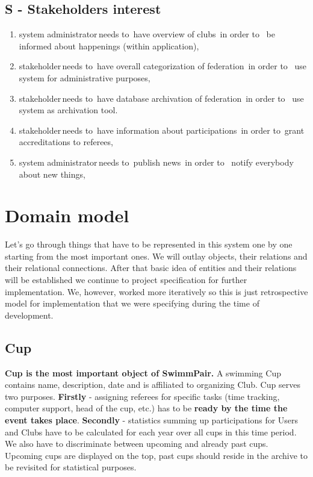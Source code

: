 \subsection*{S - Stakeholders interest}
\begin{enumerate}
  \item \lbrack system administrator\rbrack \,needs to\, \lbrack have overview of clubs\rbrack \, in order to \, \lbrack be informed about happenings (within application)\rbrack,
  \item \lbrack stakeholder\rbrack \,needs to\, \lbrack have overall categorization of federation\rbrack \, in order to \, \lbrack use system for administrative purposes\rbrack,
  \item \lbrack stakeholder\rbrack \,needs to\, \lbrack have database archivation of federation\rbrack \, in order to \, \lbrack use system as archivation tool\rbrack.
  \item \lbrack stakeholder\rbrack \,needs to\, \lbrack have information about participations\rbrack \, in order to\, \lbrack grant accreditations to referees\rbrack,
  \item \lbrack system administrator\rbrack \,needs to\, \lbrack publish news\rbrack \, in order to \, \lbrack notify everybody about new things\rbrack,
\end{enumerate}
\section{Domain model}
Let's go through things that have to be represented in this system one by one starting from the most important ones. We will outlay  objects, their relations and their relational connections. After that basic idea of entities and their relations will be established we continue to project specification for further implementation. We, however, worked more iteratively so this is just retrospective model for implementation that we were specifying during the time of development. 
\par
\subsection*{Cup}
\textbf{Cup is the most important object of SwimmPair.} A swimming Cup contains name, description, date and is affiliated to organizing Club. Cup serves two purposes. \textbf{Firstly} - assigning referees for specific tasks (time tracking, computer support, head of the cup, etc.) has to be \textbf{ready by the time the event takes place}. \textbf{Secondly} - statistics summing up participations for Users and Clubs have to be calculated for each year over all cups in this time period. We also have to discriminate between upcoming and already past cups. Upcoming cups are displayed on the top, past cups should reside in the archive to be revisited for statistical purposes.
